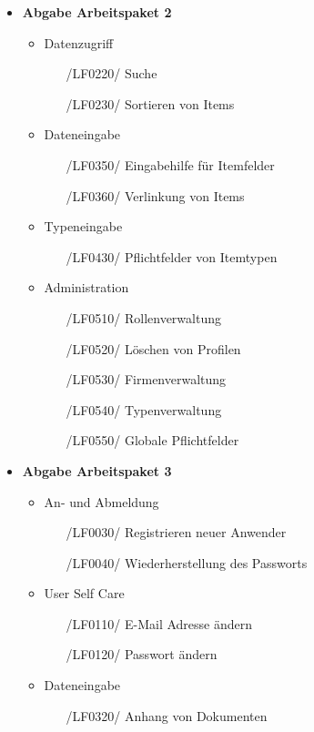 \documentclass[11pt,a4paper]{report}
\begin{document}
\begin{itemize}
\item
  \textbf{Abgabe Arbeitspaket 2}
  \begin{itemize}
	\item
    	Datenzugriff
    	\begin{itemize}
    	\leftskip=3em
    	\item[/LF0220/] Suche
    	\item[/LF0230/] Sortieren von Items
    	\end{itemize}
	\item
    	Dateneingabe
    	\begin{itemize}
    	\leftskip=3em
		\item[/LF0350/] Eingabehilfe für Itemfelder
    	\item[/LF0360/] Verlinkung von Items
    	\end{itemize}
	\item
		Typeneingabe
		\begin{itemize}
		\leftskip=3em
		\item[/LF0430/] Pflichtfelder von Itemtypen
		\end{itemize}
	\item
    	Administration
    	\begin{itemize}
    	\leftskip=3em
    	\item[/LF0510/] Rollenverwaltung
    	\item[/LF0520/] Löschen von Profilen
    	\item[/LF0530/] Firmenverwaltung
    	\item[/LF0540/] Typenverwaltung
    	\item[/LF0550/] Globale Pflichtfelder
    	\end{itemize}
  \end{itemize}
\newpage
\item
  \textbf{Abgabe Arbeitspaket 3}
  \begin{itemize}
  \item
  		An- und Abmeldung
  		\begin{itemize}
  		\leftskip=3em
  		\item[/LF0030/] Registrieren neuer Anwender
  		\item[/LF0040/] Wiederherstellung des Passworts
  		\end{itemize}
  \item
    	User Self Care
    	\begin{itemize}
    	\leftskip=3em
    	\item[/LF0110/] E-Mail Adresse ändern
    	\item[/LF0120/] Passwort ändern
    	\end{itemize}
  \item
    	Dateneingabe
    	\begin{itemize}
    	\leftskip=3em
    	\item[/LF0320/] Anhang von Dokumenten
    	\end{itemize}
  \end{itemize}


\end{itemize}
\end{document}
